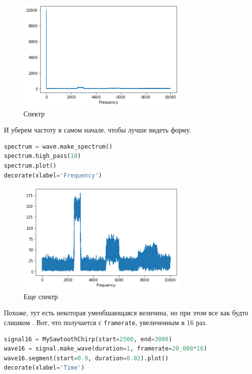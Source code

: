 \documentclass[a4paper,12pt]{report}
\begin{document}
    \begin{figure}[H]
        \centering
        \includegraphics[width=0.75\textwidth]{ex3_first.png}
        \caption{Спектр}
        \label{fig:ex3_first}
    \end{figure}
    
    И уберем частоту в самом начале, чтобы лучше видеть форму.
    
\begin{lstlisting}[language=Python,caption=Еще спектр]
spectrum = wave.make_spectrum()
spectrum.high_pass(10)
spectrum.plot()
decorate(xlabel='Frequency')
\end{lstlisting}

    \begin{figure}[H]
        \centering
        \includegraphics[width=0.75\textwidth]{ex3_second.png}
        \caption{Еще спектр}
        \label{fig:ex3_second}
    \end{figure}
    
    Похоже, тут есть некоторая уменбшающаяся величина, но при этом все как будто слишком . Вот, что получается с \texttt{framerate}, увеличенным в 16 раз.
    
\begin{lstlisting}[language=Python,caption=Новый сигнал]
signal16 = MySawtoothChirp(start=2500, end=3000)
wave16 = signal.make_wave(duration=1, framerate=20_000*16)
wave16.segment(start=0.9, duration=0.02).plot()
decorate(xlabel='Time')
\end{lstlisting}
\end{document}
